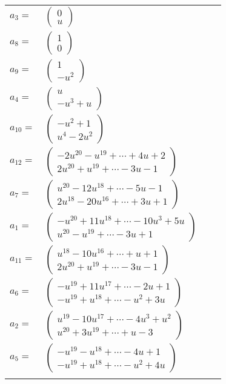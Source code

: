 \documentclass[1p]{elsarticle_modified}
\theoremstyle{definition}
\begin{document}
\begin{tabular}{m{7pt} m{180pt} m{7pt} m{180pt} }
\flushright $a_{3}=$&$\begin{pmatrix}0\\u\end{pmatrix}$ \\
\flushright $a_{8}=$&$\begin{pmatrix}1\\0\end{pmatrix}$ \\
\flushright $a_{9}=$&$\begin{pmatrix}1\\- u^2\end{pmatrix}$ \\
\flushright $a_{4}=$&$\begin{pmatrix}u\\- u^3+u\end{pmatrix}$ \\
\flushright $a_{10}=$&$\begin{pmatrix}- u^2+1\\u^4-2 u^2\end{pmatrix}$ \\
\flushright $a_{12}=$&$\begin{pmatrix}-2 u^{20}- u^{19}+\cdots+4 u+2\\2 u^{20}+u^{19}+\cdots-3 u-1\end{pmatrix}$ \\
\flushright $a_{7}=$&$\begin{pmatrix}u^{20}-12 u^{18}+\cdots-5 u-1\\2 u^{18}-20 u^{16}+\cdots+3 u+1\end{pmatrix}$ \\
\flushright $a_{1}=$&$\begin{pmatrix}- u^{20}+11 u^{18}+\cdots-10 u^3+5 u\\u^{20}- u^{19}+\cdots-3 u+1\end{pmatrix}$ \\
\flushright $a_{11}=$&$\begin{pmatrix}u^{18}-10 u^{16}+\cdots+u+1\\2 u^{20}+u^{19}+\cdots-3 u-1\end{pmatrix}$ \\
\flushright $a_{6}=$&$\begin{pmatrix}- u^{19}+11 u^{17}+\cdots-2 u+1\\- u^{19}+u^{18}+\cdots- u^2+3 u\end{pmatrix}$ \\
\flushright $a_{2}=$&$\begin{pmatrix}u^{19}-10 u^{17}+\cdots-4 u^3+u^2\\u^{20}+3 u^{19}+\cdots+u-3\end{pmatrix}$ \\
\flushright $a_{5}=$&$\begin{pmatrix}- u^{19}- u^{18}+\cdots-4 u+1\\- u^{19}+u^{18}+\cdots- u^2+4 u\end{pmatrix}$\\&\end{tabular}
\end{document}
